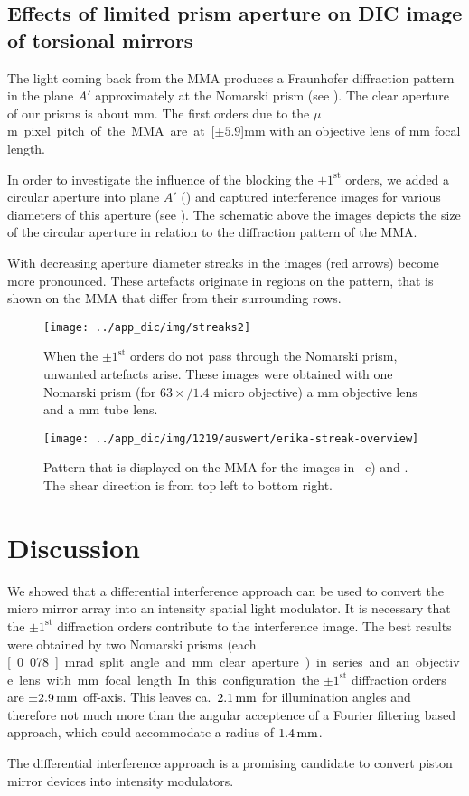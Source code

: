 \subsection{Effects of limited prism aperture on DIC image of
  torsional mirrors}
\label{sec:size}
The light coming back from the MMA produces a Fraunhofer diffraction
pattern in the plane $A'$ approximately at the Nomarski prism (see
). The clear aperture of our prisms is about
\unit[10]{mm}. The first orders due to the \unit[16]{$\mu$m} pixel
pitch of the MMA are at \unit[$\pm5.9$]{mm} with an objective lens of
\unit[200]{mm} focal length.

In order to investigate the influence of the blocking the
$\pm1^\textrm{st}$ orders, we added a circular aperture into plane
$A'$ () and captured interference images for
various diameters of this aperture (see ).  The
schematic above the images depicts the size of the circular aperture
in relation to the diffraction pattern of the MMA.

With decreasing aperture diameter streaks in the images (red arrows)
become more pronounced. These artefacts originate in regions on the
pattern, that is shown on the MMA that differ from their surrounding
rows. 

\begin{figure}[!htb]
  \centering
  \texttt{[image: ../app\_dic/img/streaks2]}
  \caption{When the $\pm1^\textrm{st}$ orders do not pass through the
    Nomarski prism, unwanted artefacts arise.  These images were
    obtained with one Nomarski prism (for $63\times/1.4$ micro
    objective) a \unit[200]{mm} objective lens and a \unit[500]{mm}
    tube lens.}
  \label{fig:erikas}
\end{figure}
\begin{figure}[!hbtp]
   \centering
   \texttt{[image: ../app\_dic/img/1219/auswert/erika-streak-overview]}
   \caption{Pattern that is displayed on the MMA for the images in
     ~c) and . The shear
     direction is from top left to bottom right.}
   \label{fig:erika-streak-overview}
 \end{figure}
\section{Discussion}
We showed that a differential interference approach can be used to
convert the micro mirror array into an intensity spatial light
modulator. It is necessary that the $\pm1^\textrm{st}$ diffraction
orders contribute to the interference image. The best results were
obtained by two Nomarski prisms (each \unit[0.078]{mrad} split angle
and \unit[10]{mm} clear aperture) in series and an objective lens with
\unit[100]{mm} focal length. In this configuration the
$\pm1^\textrm{st}$ diffraction orders are $\unit[\pm2.9]{mm}$
off-axis. This leaves ca.\ $\unit[2.1]{mm}$ for illumination angles
and therefore not much more than the angular acceptence of a Fourier
filtering based approach, which could accommodate a radius of
$\unit[1.4]{mm}$.

The differential interference approach is a promising candidate to
convert piston mirror devices into intensity modulators.
